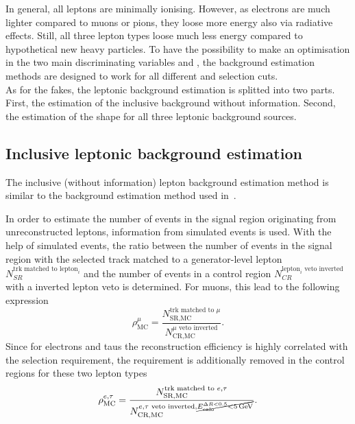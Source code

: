 In general, all leptons are minimally ionising.
However, as electrons are much lighter compared to muons or pions, they loose more energy also via radiative effects.
Still, all three lepton types loose much less energy compared to hypothetical new heavy particles.
To have the possibility to make an optimisation in the two main discriminating variables \pt and \ias, the background estimation methods are designed to work for all different \pt and \ias selection cuts.\\





As for the fakes, the leptonic background estimation is splitted into two parts.
First, the estimation of the inclusive background without \ias information.
Second, the estimation of the \ias shape for all three leptonic background sources.


\subsection{Inclusive leptonic background estimation}
The inclusive (without \ias information) lepton background estimation method is similar to the background estimation method used in~\cite{bib:CMS:DT_Thesis,bib:CMS:DT_8TeV_AN}.

In order to estimate the number of events in the signal region originating from unreconstructed leptons, information from simulated events is used.
With the help of simulated \WJets events, the ratio \leptonscalefactor between the number of events in the signal region with the selected track matched to a generator-level lepton $N_{SR}^{\text{trk matched to lepton}_i}$
 and the number of events in a control region $N_{CR}^{\text{lepton}_i\text{ veto inverted}}$ with a inverted lepton veto is determined.
For muons, this lead to the following expression
\begin{equation*}
\rho_{\text{MC}}^{\mu} = \frac{N_{\text{SR,MC}}^{\text{trk matched to }\mu}}{N_{\text{CR,MC}}^{\mu \text{ veto inverted}}}.
\end{equation*}
Since for electrons and taus the reconstruction efficiency is highly correlated with the \ecalo selection requirement, the \ecalo requirement is additionally removed in the control regions for these two lepton types 
\begin{equation*}
\rho_{\text{MC}}^{e,\tau} = \frac{N_{\text{SR,MC}}^{\text{trk matched to }e,\tau}}{N_{\text{CR,MC}}^{e,\tau\text{ veto inverted}, \cancel{E^{\Delta R<0.5}_{\text{calo}}<5\,\text{Ge}\kern-0.06667em\text{V}}}}.
\end{equation*}


